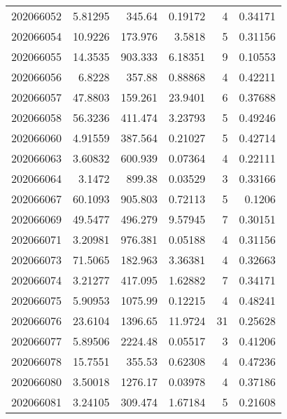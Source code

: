 \begin{tabular}{rrrrrr}
 202066052 &          5.81295 &      345.64   &            0.19172 &           4 & 0.34171 \\
 202066054 &         10.9226  &      173.976  &            3.5818  &           5 & 0.31156 \\
 202066055 &         14.3535  &      903.333  &            6.18351 &           9 & 0.10553 \\
 202066056 &          6.8228  &      357.88   &            0.88868 &           4 & 0.42211 \\
 202066057 &         47.8803  &      159.261  &           23.9401  &           6 & 0.37688 \\
 202066058 &         56.3236  &      411.474  &            3.23793 &           5 & 0.49246 \\
 202066060 &          4.91559 &      387.564  &            0.21027 &           5 & 0.42714 \\
 202066063 &          3.60832 &      600.939  &            0.07364 &           4 & 0.22111 \\
 202066064 &          3.1472  &      899.38   &            0.03529 &           3 & 0.33166 \\
 202066067 &         60.1093  &      905.803  &            0.72113 &           5 & 0.1206  \\
 202066069 &         49.5477  &      496.279  &            9.57945 &           7 & 0.30151 \\
 202066071 &          3.20981 &      976.381  &            0.05188 &           4 & 0.31156 \\
 202066073 &         71.5065  &      182.963  &            3.36381 &           4 & 0.32663 \\
 202066074 &          3.21277 &      417.095  &            1.62882 &           7 & 0.34171 \\
 202066075 &          5.90953 &     1075.99   &            0.12215 &           4 & 0.48241 \\
 202066076 &         23.6104  &     1396.65   &           11.9724  &          31 & 0.25628 \\
 202066077 &          5.89506 &     2224.48   &            0.05517 &           3 & 0.41206 \\
 202066078 &         15.7551  &      355.53   &            0.62308 &           4 & 0.47236 \\
 202066080 &          3.50018 &     1276.17   &            0.03978 &           4 & 0.37186 \\
 202066081 &          3.24105 &      309.474  &            1.67184 &           5 & 0.21608 \\

\end{tabular}
